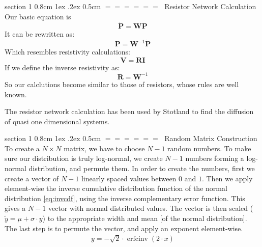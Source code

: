 \documentclass[onecolumn,fleqn,notitlepage,secnumarabic]{revtex4}
\makeatletter
\def\section{%
  \@startsection
    {section}%
    {1}%
    {\z@}%
    {0.8cm \@plus1ex \@minus .2ex}%
    {0.5cm}%
    {\Large\bf $=\!=\!=\!=\!=\!=\;$}%
}%
\makeatother
\begin{document}
\section{Resistor Network Calculation} \label{sec:res_net}
Our basic equation is 
\[ \boldsymbol{ \dot P } = \boldsymbol{W} \boldsymbol{P} \]
It can be rewritten as:
\[  \boldsymbol{P} = \boldsymbol{W}^{-1}\boldsymbol{ \dot P } \]
Which resembles resistivity calculations:
\[ \boldsymbol{V} = \boldsymbol{R}\boldsymbol{ I } \]
If we define the inverse resistivity as:
\[ \boldsymbol{R} = \boldsymbol{W}^{-1} \]
So our calclutions become similar to those of resistors, whose rules are well known.

The resistor network calculation has been used by Stotland to find the diffusion of quasi one dimensional systems.

\section{Random Matrix Construction}\label{sec:matrix_construction}
To create a $N\times N$ matrix, we have to choose $N-1$ random numbers. To make sure our distribution is truly log-normal, we create $N-1$ numbers forming a log-normal distribution, and permute them. In order to create the numbers, first we create a vector of $N-1$ linearly spaced values between $0$ and $1$. Then we apply element-wise the inverse cumulative distribution function of the normal distribution \ref{eq:invcdf}, using the inverse complementary error function. This gives a $N-1$ vector with normal distributed values. The vector is then scaled ($\tilde{y} = \mu+\sigma\cdot y$) to the appropriate width and mean [of the normal distribution]. The last step is to permute the vector, and apply an exponent element-wise.
\begin{align}\label{eq:invcdf}
y = -\sqrt{2}\cdot\operatorname{erfcinv}(2\cdot x) 
\end{align}
\end{document}
